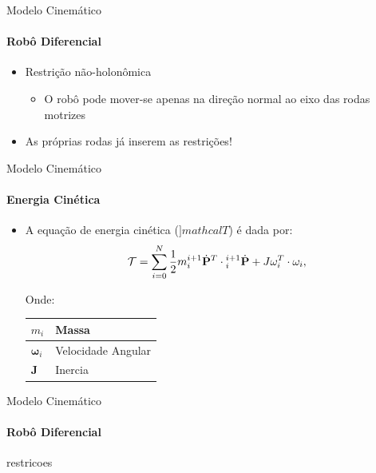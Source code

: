 \documentclass{beamer}
\begin{document}
\begin{frame}{Modelo Cinemático}
    \framesubtitle{Robô Diferencial}
    \begin{itemize}
        \item Restrição não-holonômica
        \begin{itemize}
            \item O robô pode mover-se apenas na direção normal ao eixo das rodas motrizes
        \end{itemize}
    \item As próprias rodas já inserem as restrições!
    \end{itemize}
    \centering
    
\end{frame}

\begin{frame}{Modelo Cinemático}
    \framesubtitle{Energia Cinética}
    \begin{itemize}
        \item A equação de energia cinética ($]mathcal{T}$) é dada por:
        \begin{equation}
        \mathcal{T} = \sum\limits_{i=0}^{N} \frac{1}{2} m {}_{i}^{i+1} \dot{\mathbf{P}}^T \cdot {}_{i}^{i+1}\dot{\mathbf{P}}+ J\boldmath{\omega}_i^T\cdot \boldmath{\omega}_i,
        \end{equation}
        \newline

        Onde:
        \newline
        
        \begin{tabular}{l | l}
            \hline
            $m_i$ & Massa \\ \hline
            $\mathbf{\omega}_i$ & Velocidade Angular \\ \hline
            $\mathbf{J}$ & Inercia \\ \hline
        \end{tabular}

    \end{itemize}
\end{frame}


\begin{frame}{Modelo Cinemático}
    \framesubtitle{Robô Diferencial}
    restricoes
    
\end{frame}
\end{document}

